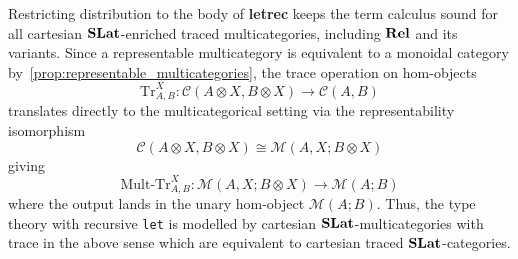 Restricting distribution to the body of \textbf{letrec} keeps the term calculus sound for all cartesian $\mathbf{SLat}$-enriched traced multicategories, including $\mathbf{Rel}$ and its variants.
Since a representable multicategory is equivalent to a monoidal category by~\autoref{prop:representable_multicategories}, the trace operation on hom-objects
\[
\text{Tr}_{A,B}^X : \mathcal{C}(A \otimes X, B \otimes X) \to \mathcal{C}(A, B)
\]
translates directly to the multicategorical setting via the representability isomorphism
\[
\mathcal{C}(A \otimes X, B \otimes X) \cong \mathcal{M}(A, X; B \otimes X)
\]
giving
\[
\text{Mult-Tr}_{A,B}^X : \mathcal{M}(A, X; B \otimes X) \to \mathcal{M}(A; B)
\]
where the output lands in the unary hom-object $\mathcal{M}(A; B)$.
Thus, the type theory with recursive \texttt{let} is modelled by cartesian $\mathbf{SLat}$-multicategories with trace in the above sense which are equivalent to cartesian traced $\mathbf{SLat}$-categories.

